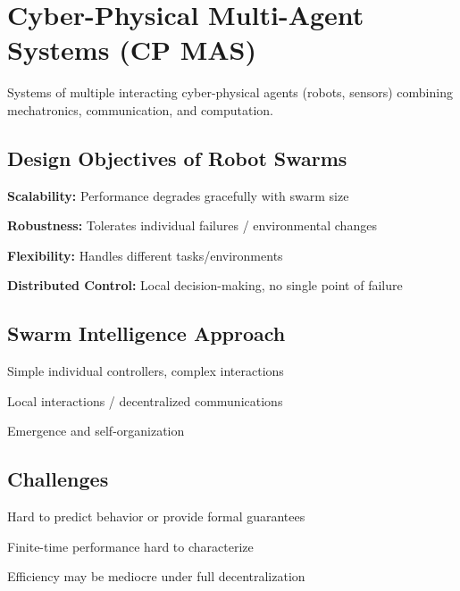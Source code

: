 \section*{Cyber-Physical Multi-Agent Systems (CP MAS)}
Systems of multiple interacting cyber-physical agents (robots, sensors) combining mechatronics, communication, and computation.  

\subsection*{Design Objectives of Robot Swarms}
\begin{tightitemize}
    \item \textbf{Scalability:} Performance degrades gracefully with swarm size
    \item \textbf{Robustness:} Tolerates individual failures / environmental changes
    \item \textbf{Flexibility:} Handles different tasks/environments
    \item \textbf{Distributed Control:} Local decision-making, no single point of failure
\end{tightitemize}

\subsection*{Swarm Intelligence Approach}
\begin{tightitemize}
    \item Simple individual controllers, complex interactions
    \item Local interactions / decentralized communications
    \item Emergence and self-organization
\end{tightitemize}

\subsection*{Challenges}
\begin{tightitemize}
    \item Hard to predict behavior or provide formal guarantees
    \item Finite-time performance hard to characterize
    \item Efficiency may be mediocre under full decentralization
\end{tightitemize}

